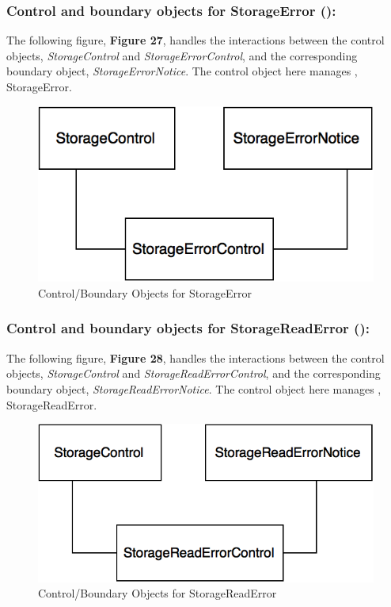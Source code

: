 \documentclass[12pt,letterpaper]{article}
\begin{document}
\subsubsection*{Control and boundary objects for StorageError (\storageerror{}):}

The following figure, {\bf Figure 27}, handles the interactions between the control objects, {\it StorageControl} and {\it StorageErrorControl}, and the corresponding boundary object, 
{\it StorageErrorNotice}. The control object here manages \storageerror{}, StorageError.

\begin{figure}[H]
	\centering{}
	\includegraphics[scale=0.37]{imgs/cbod/storage-error.png}
	\caption{Control/Boundary Objects for StorageError}
\end{figure}

\newpage{}

\subsubsection*{Control and boundary objects for StorageReadError (\storagereaderror{}):}

The following figure, {\bf Figure 28}, handles the interactions between the control objects, {\it StorageControl} and {\it StorageReadErrorControl}, and the corresponding boundary object, 
{\it StorageReadErrorNotice}. The control object here manages \storagereaderror{}, StorageReadError.

\begin{figure}[H]
	\centering{}
	\includegraphics[scale=0.37]{imgs/cbod/storage-read-error.png}
	\caption{Control/Boundary Objects for StorageReadError}
\end{figure}
\end{document}
